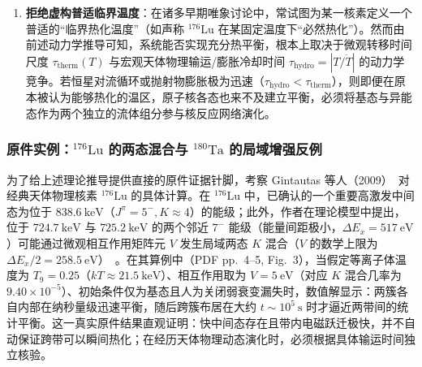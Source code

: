 \begin{enumerate}
\begin{equation}
\end{equation}
其中 $Z_g(T) = \sum_{j \in g} (2J_j + 1) e^{-(E_j - E_g)/kT}$ 与 $Z_m(T) = \sum_{k \in m} (2J_k + 1) e^{-(E_k - E_m)/kT}$ 分别为基态簇与异能态簇的内部转动配分函数。将式~\eqref{eq:4-8-partition-ratio}代入式~\eqref{eq:4-8-effective-decay-approx}，全系统的宏观有效衰变破坏率表现为著名的热加权平均形式：
\begin{equation}\label{eq:4-8-therm-decay-average}
D_{\mathrm{eff}}(T) \simeq \frac{Z_g(T) D_g + Z_m(T) e^{-(E_m - E_g)/kT} D_m}{Z_g(T) + Z_m(T) e^{-(E_m - E_g)/kT}}.
\end{equation}
这一经典公式成立的前提是跨带交换时间必须远短于体系的弱衰变破坏寿命以及恒星流体运动/冷却时间尺度（$\tau_{\mathrm{therm}} \ll \min\{D_g^{-1}, D_m^{-1}, \tau_{\mathrm{hydro}}\}$）。
\item \textbf{拒绝虚构普适临界温度}：在诸多早期唯象讨论中，常试图为某一核素定义一个普适的“临界热化温度”（如声称 $^{176}\mathrm{Lu}$ 在某固定温度下“必然热化”）。然而由前述动力学推导可知，系统能否实现充分热平衡，根本上取决于微观转移时间尺度 $\tau_{\mathrm{therm}}(T)$ 与宏观天体物理输运/膨胀冷却时间 $\tau_{\mathrm{hydro}} = |T / \dot{T}|$ 的动力学竞争。若恒星对流循环或抛射物膨胀极为迅速（$\tau_{\mathrm{hydro}} < \tau_{\mathrm{therm}}$），则即便在原本被认为能够热化的温区，原子核各态也来不及建立平衡，必须将基态与异能态作为两个独立的流体组分参与核反应网络演化。
\end{enumerate}

\subsubsection{原件实例：$^{176}\mathrm{Lu}$ 的两态混合与 $^{180}\mathrm{Ta}$ 的局域增强反例}

为了给上述理论推导提供直接的原件证据针脚，考察 Gintautas 等人（2009）~\cite{gintautas-2009-176lu-thermal-equilibration}对经典天体物理核素 $^{176}\mathrm{Lu}$ 的具体计算。在 $^{176}\mathrm{Lu}$ 中，已确认的一个重要高激发中间态为位于 $838.6\ \mathrm{keV}$（$J^\pi = 5^-, K \approx 4$）的能级；此外，作者在理论模型中提出，位于 $724.7\ \mathrm{keV}$ 与 $725.2\ \mathrm{keV}$ 的两个邻近 $7^-$ 能级（能量间距极小，$\Delta E_x = 517\ \mathrm{eV}$）可能通过微观相互作用矩阵元 $V$ 发生局域两态 $K$ 混合（$V$ 的数学上限为 $\Delta E_x / 2 = 258.5\ \mathrm{eV}$）~\cite{gintautas-2009-176lu-thermal-equilibration}。在其算例中（PDF pp.~4--5, Fig.~3），当假定等离子体温度为 $T_9 = 0.25$（$kT \approx 21.5\ \mathrm{keV}$）、相互作用取为 $V = 5\ \mathrm{eV}$（对应 $K$ 混合几率为 $9.40 \times 10^{-5}$）、初始条件仅为基态且人为关闭弱衰变漏失时，数值解显示：两簇各自内部在纳秒量级迅速平衡，随后跨簇布居在大约 $t \sim 10^5\ \mathrm{s}$ 时才逼近两带间的统计平衡。这一真实原件结果直观证明：快中间态存在且带内电磁跃迁极快，并不自动保证跨带可以瞬间热化；在经历天体物理动态演化时，必须根据具体输运时间独立核验。

